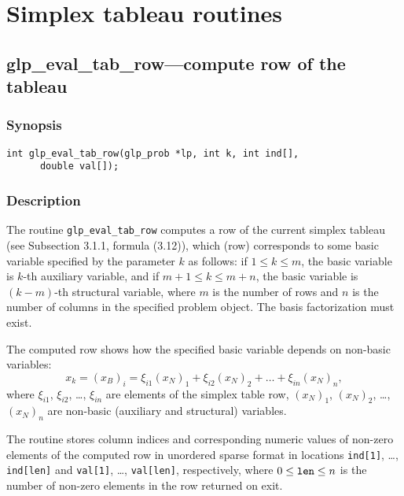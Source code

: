
\newpage

\section{Simplex tableau routines}

\subsection{glp\_eval\_tab\_row---compute row of the tableau}

\subsubsection*{Synopsis}

\begin{verbatim}
int glp_eval_tab_row(glp_prob *lp, int k, int ind[],
      double val[]);
\end{verbatim}

\subsubsection*{Description}

The routine \verb|glp_eval_tab_row| computes a row of the current
simplex tableau (see Subsection 3.1.1, formula (3.12)), which (row)
corresponds to some basic variable specified by the parameter $k$ as
follows: if $1\leq k\leq m$, the basic variable is $k$-th auxiliary
variable, and if $m+1\leq k\leq m+n$, the basic variable is $(k-m)$-th
structural variable, where $m$ is the number of rows and $n$ is the
number of columns in the specified problem object. The basis
factorization must exist.

The computed row shows how the specified basic variable depends on
non-basic variables:
$$x_k=(x_B)_i=\xi_{i1}(x_N)_1+\xi_{i2}(x_N)_2+\dots+\xi_{in}(x_N)_n,$$
where $\xi_{i1}$, $\xi_{i2}$, \dots, $\xi_{in}$ are elements of the
simplex table row, $(x_N)_1$, $(x_N)_2$, \dots, $(x_N)_n$ are non-basic
(auxiliary and structural) variables.

The routine stores column indices and corresponding numeric values of
non-zero elements of the computed row in unordered sparse format in
locations \verb|ind[1]|, \dots, \verb|ind[len]| and \verb|val[1]|,
\dots, \verb|val[len]|, respectively, where $0\leq{\tt len}\leq n$ is
the number of non-zero elements in the row returned on exit.

